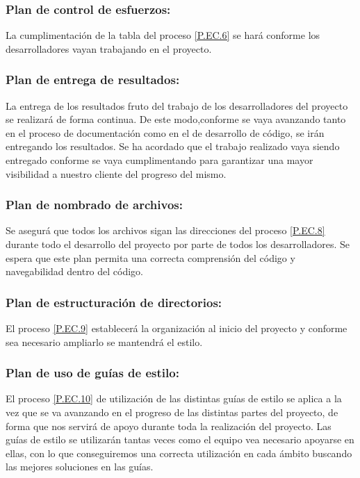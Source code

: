 \documentclass{article}
\begin{document}
\subsubsection{Plan de control de esfuerzos:} \label{PL.EC.4}

La cumplimentación de la tabla del proceso \ref{P.EC.6} se hará conforme los desarrolladores vayan trabajando en el proyecto.

\subsubsection{Plan de entrega de resultados:} \label{PL.EC.5}

La entrega de los resultados fruto del trabajo de los desarrolladores del proyecto se realizará de forma continua. De este modo,conforme se vaya avanzando tanto en el proceso de documentación como en el de desarrollo de código, se irán entregando los resultados.
Se ha acordado que el trabajo realizado vaya siendo entregado conforme se vaya cumplimentando para garantizar una mayor visibilidad a nuestro cliente del progreso del mismo.

\subsubsection{Plan de nombrado de archivos:} \label{PL.EC.6}

Se asegurá que todos los archivos sigan las direcciones del proceso \ref{P.EC.8} durante todo el desarrollo del proyecto por parte de todos los desarrolladores. Se espera que este plan permita una correcta comprensión del código y navegabilidad dentro del código.

\subsubsection{Plan de estructuración de directorios: } \label{PL.EC.7}

El proceso \ref{P.EC.9} establecerá la organización al inicio del proyecto y conforme sea necesario ampliarlo se mantendrá el estilo.

\subsubsection{Plan de uso de guías de estilo: } \label{PL.EC.8}
El proceso \ref{P.EC.10} de utilización de las distintas guías de estilo se aplica a la vez que se va avanzando en el progreso de las distintas partes del proyecto, de forma que nos servirá de apoyo durante toda la realización del proyecto.
Las guías de estilo se utilizarán tantas veces como el equipo vea necesario apoyarse en ellas, con lo que conseguiremos una correcta utilización en cada ámbito buscando las mejores soluciones en las guías.
\end{document}
